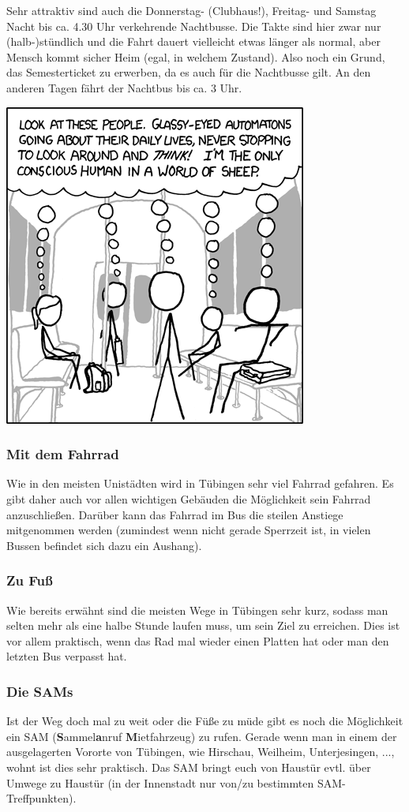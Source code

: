 Sehr attraktiv sind auch die Donnerstag- (Clubhaus!), Freitag- und Samstag Nacht bis ca. 4.30 Uhr verkehrende Nachtbusse.  Die Takte sind hier zwar nur (halb-)stündlich und die Fahrt dauert vielleicht etwas länger als normal, aber Mensch kommt sicher Heim (egal, in welchem Zustand).  Also noch ein Grund, das Semesterticket zu erwerben, da es auch für die Nachtbusse gilt. An den anderen Tagen fährt der Nachtbus bis ca. 3 Uhr.

\begin{center}
\includegraphics[width=0.5\hsize]{info/xkcd/sheeple.png}
\end{center}

\subsubsection*{Mit dem Fahrrad}
Wie in den meisten Unistädten wird in Tübingen sehr viel Fahrrad gefahren. Es gibt daher auch vor allen wichtigen Gebäuden die Möglichkeit sein Fahrrad anzuschließen. Darüber kann das Fahrrad im Bus die steilen Anstiege mitgenommen werden (zumindest wenn nicht gerade Sperrzeit ist, in vielen Bussen befindet sich dazu ein Aushang).

\subsubsection*{Zu Fuß}
Wie bereits erwähnt sind die meisten Wege in Tübingen sehr kurz, sodass man selten mehr als eine halbe Stunde laufen muss, um sein Ziel zu erreichen. Dies ist vor allem praktisch, wenn das Rad mal wieder einen Platten hat oder man den letzten Bus verpasst hat.

\subsubsection*{Die SAMs}
Ist der Weg doch mal zu weit oder die Füße zu müde gibt es noch die Möglichkeit ein SAM (\textbf{S}ammel\textbf{a}nruf
\textbf{M}ietfahrzeug) zu rufen. Gerade wenn man in einem der ausgelagerten Vororte von Tübingen, wie Hirschau,
Weilheim, Unterjesingen, ..., wohnt ist dies sehr praktisch. Das SAM bringt euch von Haustür evtl. über Umwege zu Haustür (in der Innenstadt nur von/zu bestimmten SAM-Treffpunkten).

